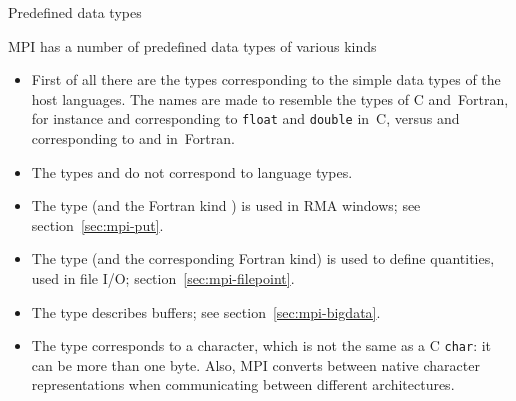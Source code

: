
 {Predefined data types}
\label{sec:predefined}

MPI has a number of predefined data types of various kinds
\begin{itemize}
\item First of all there are the types corresponding to the 
  simple data types of the host languages.
  The names are made to resemble the types of C and~Fortran, 
  for instance  and 
  corresponding to \lstinline{float} and \lstinline{double} in~C,
  versus
   and 
  corresponding to  and 
  in~Fortran.
\item The types  and 
  do not correspond to language types.
\item The type 
  (and the Fortran kind )
  is used in \ac{RMA} windows; see section~\ref{sec:mpi-put}.
\item The type 
  (and the corresponding Fortran  kind)
  is used to define  quantities,
  used in file I/O; section~\ref{sec:mpi-filepoint}.
\item The type  describes buffers;
  see section~\ref{sec:mpi-bigdata}.
\item The type  corresponds to a character, which
  is not the same as a C \lstinline{char}: it can be more than one byte.
  Also, MPI converts between native character representations when communicating
  between different architectures.
\end{itemize}

\begin{comment}
  MPI calls accept arrays of elements:
  \begin{lstlisting}
    double x[20];
    MPI_Send( x,20,MPI_DOUBLE, ..... )
  \end{lstlisting}
  so for a single element you need to take its address:
  \begin{lstlisting}
    double x;
    MPI_Send( &x,1,MPI_DOUBLE, ..... )
  \end{lstlisting}
\end{comment}

